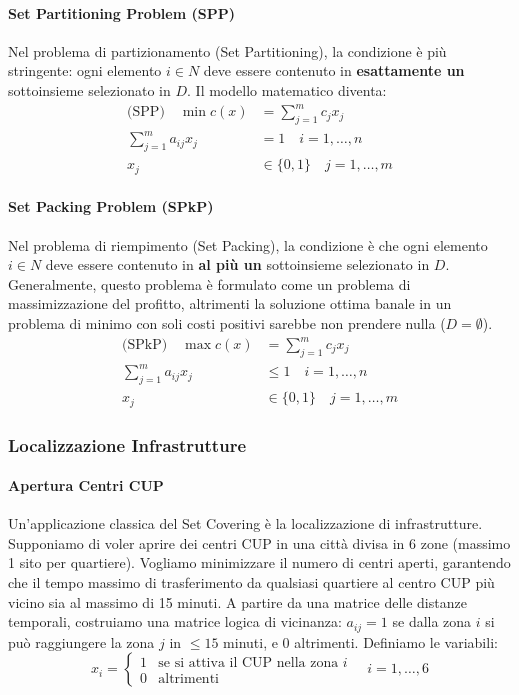 \documentclass[12pt]{extarticle} %
\begin{document}
\paragraph{Set Partitioning Problem (SPP)}
Nel problema di partizionamento (Set Partitioning), la condizione è più stringente: ogni elemento $i \in N$ deve essere contenuto in \textbf{esattamente un} sottoinsieme selezionato in $D$.
Il modello matematico diventa:
\[
\begin{aligned}
\text{(SPP)} \quad \min c(x) &= \sum_{j=1}^m c_j x_j \\
\sum_{j=1}^m a_{ij}x_j &= 1 \quad i=1,\dots,n \\
x_j &\in \{0,1\} \quad j=1,\dots,m
\end{aligned}
\]

\paragraph{Set Packing Problem (SPkP)}
Nel problema di riempimento (Set Packing), la condizione è che ogni elemento $i \in N$ deve essere contenuto in \textbf{al più un} sottoinsieme selezionato in $D$. Generalmente, questo problema è formulato come un problema di massimizzazione del profitto, altrimenti la soluzione ottima banale in un problema di minimo con soli costi positivi sarebbe non prendere nulla ($D = \emptyset$).
\[
\begin{aligned}
\text{(SPkP)} \quad \max c(x) &= \sum_{j=1}^m c_j x_j \\
\sum_{j=1}^m a_{ij}x_j &\le 1 \quad i=1,\dots,n \\
x_j &\in \{0,1\} \quad j=1,\dots,m
\end{aligned}
\]

\subsubsection{Localizzazione Infrastrutture}

\paragraph{Apertura Centri CUP}
Un'applicazione classica del Set Covering è la localizzazione di infrastrutture. Supponiamo di voler aprire dei centri CUP in una città divisa in 6 zone (massimo 1 sito per quartiere). Vogliamo minimizzare il numero di centri aperti, garantendo che il tempo massimo di trasferimento da qualsiasi quartiere al centro CUP più vicino sia al massimo di 15 minuti.
A partire da una matrice delle distanze temporali, costruiamo una matrice logica di vicinanza: $a_{ij} = 1$ se dalla zona $i$ si può raggiungere la zona $j$ in $\le 15$ minuti, e $0$ altrimenti. Definiamo le variabili:
\[
x_i = \begin{cases}
1 & \text{se si attiva il CUP nella zona } i \\
0 & \text{altrimenti}
\end{cases} \quad i=1,\dots,6
\]
\end{document}
